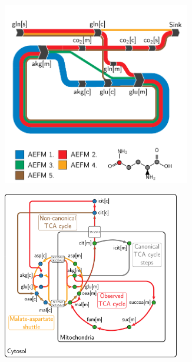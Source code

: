\documentclass[varwidth]{standalone}
\begin{document}
\begin{figure}
\begin{subfigure}[t]{0.495\textwidth}
    \end{subfigure}
    \begin{subfigure}[t]{0.495\textwidth}
        \caption{}
        \centering
        \includegraphics[width=0.9\textwidth,trim={0.0cm 0.0cm 0.0cm 1.0cm},clip]{subpanels-c-f/glutamine/carbon-5/04-add-labels/add-labels.pdf}
    \end{subfigure}
    \begin{subfigure}[t]{0.495\textwidth}
        \caption{}
        \centering
        \includegraphics[width=0.85\textwidth,trim={0.0cm 0.0cm 0.0cm 0.0cm},clip]{subpanels-c-f/glutamine/network-mapping/network.pdf}
    \end{subfigure}
\end{figure}
\end{document}
